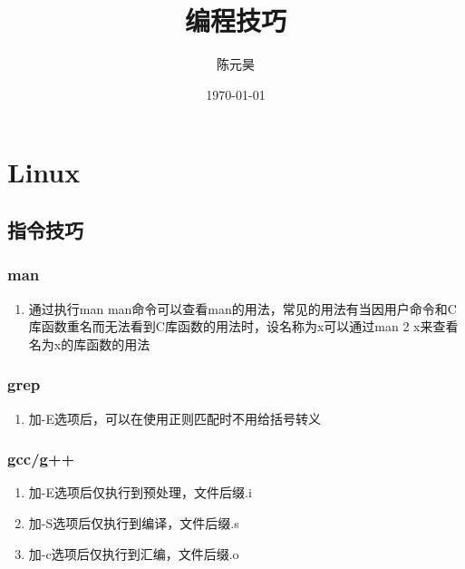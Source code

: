 \documentclass[onecolumn]{article}
\title{编程技巧}
\author{陈元昊}
\date{\today}
\begin{document}
\maketitle
\renewcommand{\contentsname}{目录}
\tableofcontents
\section{Linux}
    \subsection{指令技巧}
        \subsubsection{man}
            \noindent
            \begin{enumerate}
                \item 通过执行man man命令可以查看man的用法，常见的用法有当因用户命令和C库函数重名而无法看到C库函数的用法时，设名称为x可以通过man 2 x来查看名为x的库函数的用法
            \end{enumerate}
        \subsubsection{grep}
            \noindent
            \begin{enumerate}
                \item 加-E选项后，可以在使用正则匹配时不用给括号转义
            \end{enumerate}
        \subsubsection{gcc/g++}
            \noindent
            \begin{enumerate}
                \item 加-E选项后仅执行到预处理，文件后缀.i
                \item 加-S选项后仅执行到编译，文件后缀.s
                \item 加-c选项后仅执行到汇编，文件后缀.o
            \end{enumerate}
\end{document}
